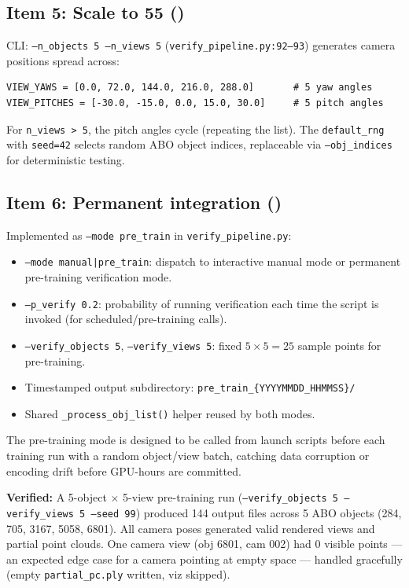 \subsection{Item 5: Scale to 5\texttimes{}5 (\checkmark)}

CLI: \texttt{--n\_objects 5 --n\_views 5} (\texttt{verify\_pipeline.py:92--93})
generates camera positions spread across:
\begin{lstlisting}
VIEW_YAWS = [0.0, 72.0, 144.0, 216.0, 288.0]       # 5 yaw angles
VIEW_PITCHES = [-30.0, -15.0, 0.0, 15.0, 30.0]     # 5 pitch angles
\end{lstlisting}
For \texttt{n\_views > 5}, the pitch angles cycle (repeating the list). The
\texttt{default\_rng} with \texttt{seed=42} selects random ABO object
indices, replaceable via \texttt{--obj\_indices} for deterministic testing.

\subsection{Item 6: Permanent integration (\checkmark)}

Implemented as \texttt{--mode pre\_train} in \texttt{verify\_pipeline.py}:

\begin{itemize}
  \item \texttt{--mode manual|pre\_train}: dispatch to interactive manual
  mode or permanent pre-training verification mode.
  \item \texttt{--p\_verify 0.2}: probability of running verification each
  time the script is invoked (for scheduled/pre-training calls).
  \item \texttt{--verify\_objects 5}, \texttt{--verify\_views 5}: fixed
  $5\times5 = 25$ sample points for pre-training.
  \item Timestamped output subdirectory:
  \texttt{pre\_train\_\{YYYYMMDD\_HHMMSS\}/}
  \item Shared \texttt{\_process\_obj\_list()} helper reused by both modes.
\end{itemize}

The pre-training mode is designed to be called from launch scripts before
each training run with a random object/view batch, catching data corruption
or encoding drift before GPU-hours are committed.

\noindent\textbf{Verified:} A 5-object $\times$ 5-view pre-training run
(\texttt{--verify\_objects 5 --verify\_views 5 --seed 99}) produced 144
output files across 5 ABO objects (284, 705, 3167, 5058, 6801). All camera
poses generated valid rendered views and partial point clouds. One camera
view (obj 6801, cam 002) had 0 visible points --- an expected edge case
for a camera pointing at empty space --- handled gracefully (empty
\texttt{partial\_pc.ply} written, viz skipped).

